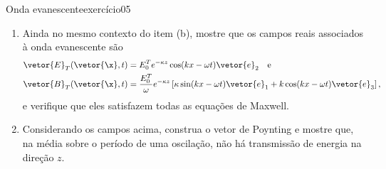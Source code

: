 \begin{exercício}{Onda evanescente}{exercício05}
\begin{enumerate}[label=(\alph*)]
        \item Ainda no mesmo contexto do item (b), mostre que os campos reais associados à onda evanescente são
            \begin{align*}
                \vetor{E}_T(\vetor{\x},t) &= E_0^T e^{- \kappa z} \cos(kx - \omega t) \vetor{e}_2
                \quad\text{e}\quad\\
                \vetor{B}_T(\vetor{\x},t) &=\frac{E_0^T}{\omega}e^{- \kappa z} \left[\kappa \sin(kx - \omega t)\vetor{e}_1 + k\cos(kx - \omega t) \vetor{e}_3\right],
            \end{align*}
            e verifique que eles satisfazem todas as equações de Maxwell.
        \item Considerando os campos acima, construa o vetor de Poynting e mostre que, na média sobre o período de uma oscilação, não há transmissão de energia na direção \(z\).
    \end{enumerate}
\end{exercício}
